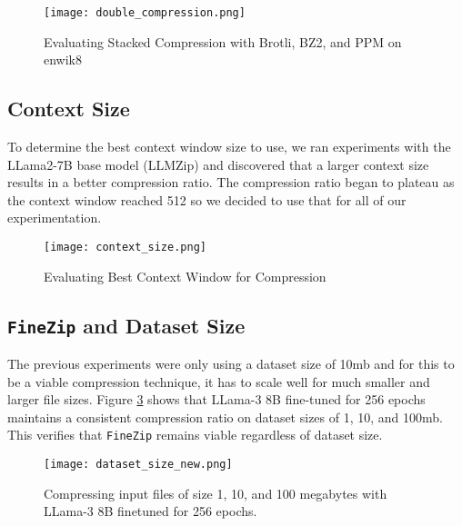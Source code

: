 \documentclass[11pt]{article}
\begin{document}


\begin{figure}[h]
    \centering
    \texttt{[image: double\_compression.png]} %
    \centering
    \caption{Evaluating Stacked Compression with Brotli, BZ2, and PPM on enwik8}
    \centering
    \label{fig:double-compression}
    \centering
\end{figure}

\subsection{Context Size} \label{sec:context_size}

To determine the best context window size to use, we ran experiments with the LLama2-7B base model (LLMZip) and discovered that a larger context size results in a better compression ratio. The compression ratio began to plateau as the context window reached 512 so we decided to use that for all of our experimentation. 

\begin{figure}[h]
    \centering
    \texttt{[image: context\_size.png]} %
    \centering
    \caption{Evaluating Best Context Window for Compression}
    \centering
    \label{fig:double-compression}
    \centering
\end{figure}



\subsection{\texttt{FineZip} and Dataset Size}

The previous experiments were only using a dataset size of 10mb and for this to be a viable compression technique, it has to scale well for much smaller and larger file sizes. Figure \ref{fig:dataset-size} shows that LLama-3 8B \cite{llama3} fine-tuned for 256 epochs maintains a consistent compression ratio on dataset sizes of 1, 10, and 100mb. This verifies that \texttt{FineZip} remains viable regardless of dataset size. 

\begin{figure}
    \centering
    \texttt{[image: dataset\_size\_new.png]} %
    \centering
    \caption{Compressing input files of size 1, 10, and 100 megabytes with LLama-3 8B finetuned for 256 epochs.}
    \centering
    \label{fig:dataset-size}
    \centering
\end{figure}
\end{document}
